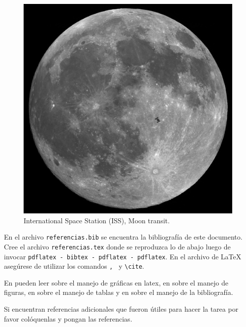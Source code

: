 \documentclass[12pt, letter]{exam}
\begin{document}
\begin{questions}
\begin{mdframed}[style=mystyle]
\begin{figure}[H]
\includegraphics[scale=0.2, angle=45]{ISS_moon}
\caption{International Space Station (ISS), Moon transit.}
\label{fig:ISS}
\end{figure}
\end{mdframed}

 En el archivo \verb"referencias.bib" se encuentra la bibliografía de este documento. Cree el archivo \verb+referencias.tex+ donde se reproduzca lo de abajo luego de invocar \verb+pdflatex - bibtex - pdflatex - pdflatex+. En el archivo de \LaTeX \,asegúrese de utilizar los comandos \verb+, + y \verb+\cite+.

\begin{mdframed}[style=mystyle]
\vspace{0.2cm}
En \citep{website:Latex-Graphics} pueden leer  sobre el manejo de gráficas en latex, en \citep{website:Latex-Figures} sobre el manejo de figuras, en \citep{website:Latex-Tables} sobre el manejo de tablas
y en \citep{website:Latex-Bibliography} sobre el manejo de la bibliografía. 

Si encuentran referencias adicionales que fueron útiles para hacer la tarea por favor colóquenlas y pongan las referencias.
 
{}

\end{mdframed}

\end{questions}
\end{document}
